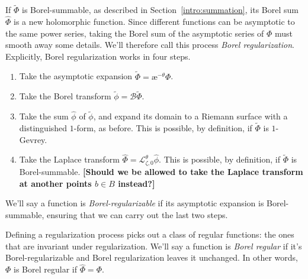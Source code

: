 \documentclass{article}
\theoremstyle{definition}
\newcommand{\series}[1]{\tilde{#1}}
\newcommand{\laplace}{\mathcal{L}}
\newcommand{\borel}{\mathcal{B}}
\newcommand{\aexp}{\text{\ae}}
\begin{document}
\begin{center}
\end{center}
If $\series{\Phi}$ is Borel-summable, as described in Section~\ref{intro:summation}, its Borel sum $\hat{\Phi}$ is a new holomorphic function.
Since different functions can be asymptotic to the same power series, taking the Borel sum of the asymptotic series of $\Phi$ must smooth away some details. We'll therefore call this process {\em Borel regularization}. Explicitly, Borel regularization works in four steps.
\begin{enumerate}
\item Take the asymptotic expansion $\series{\Phi} = \aexp^{-\theta} \Phi$.
\item Take the Borel transform $\series{\phi} = \borel \series{\Phi}$.
\item Take the sum $\hat{\phi}$ of $\series{\phi}$, and expand its domain to a Riemann surface with a distinguished $1$-form, as before. This is possible, by definition, if $\series{\Phi}$ is $1$-Gevrey.
\item Take the Laplace transform $\hat{\Phi} = \laplace_{\zeta, 0}^\theta \hat{\phi}$. This is possible, by definition, if $\series{\Phi}$ is Borel-summable. \textbf{[Should we be allowed to take the Laplace transform at another points $b \in B$ instead?]}
\end{enumerate}
We'll say a function is {\em Borel-regularizable} if its asymptotic expansion is Borel-summable, ensuring that we can carry out the last two steps.

Defining a regularization process picks out a class of regular functions: the ones that are invariant under regularization. We'll say a function is {\em Borel regular} if it's Borel-regularizable and Borel regularization leaves it unchanged. In other words, $\Phi$ is Borel regular if $\hat{\Phi} = \Phi$.
\end{document}

